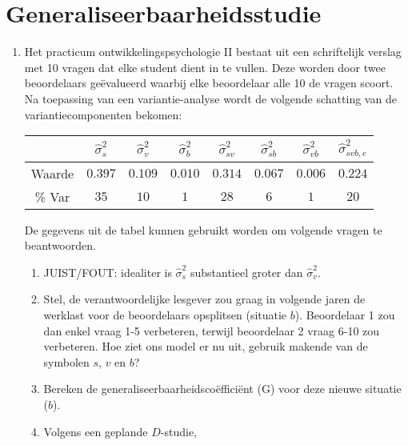 
\OPGAVE
{
\section{Generaliseerbaarheidsstudie}

\begin{enumerate}

\item
Het practicum ontwikkelingspsychologie II bestaat uit een schriftelijk verslag met 10 vragen dat elke student dient in te vullen. Deze worden door twee beoordelaars ge\"{e}valueerd waarbij elke beoordelaar alle 10 de vragen scoort.\\ 
Na toepassing van een variantie-analyse wordt de volgende schatting van de variantiecomponenten bekomen:

\begin{center}
\renewcommand{\arraystretch}{1.2}
\begin{tabular}{|c|c|c|c|c|c|c|c|} \hline
 & $ \hat{\sigma}^2_{s} $ & $ \hat{\sigma}^2_{v} $& $ \hat{\sigma}^2_{b} $ & $ \hat{\sigma}^2_{sv} $ & $ \hat{\sigma}^2_{sb} $ & $ \hat{\sigma}^2_{vb} $ & $ \hat{\sigma}^2_{svb,e} $ \\ \hline
Waarde  & $ 0.397 $ & $ 0.109 $ & $ 0.010 $ & $ 0.314 $ & $ 0.067 $ & $ 0.006 $ & $ 0.224 $ \\ 
\% Var & $ 35 $ & $ 10 $ & $ 1 $ & $ 28 $ & $ 6 $ & $ 1 $ & $ 20 $ \\ \hline
\end{tabular}
\end{center}


\normalsize
De gegevens uit de tabel kunnen gebruikt worden om volgende vragen te beantwoorden.

\begin{enumerate}
\item JUIST/FOUT: idealiter is $ \hat{\sigma}^2_{s} $ substantieel groter dan $ \hat{\sigma}^2_{v}$.
\item Stel, de verantwoordelijke lesgever zou graag in volgende jaren de werklast voor de beoordelaars opsplitsen (situatie $b$). Beoordelaar 1 zou dan enkel vraag 1-5 verbeteren, terwijl beoordelaar 2 vraag 6-10 zou verbeteren. Hoe ziet ons model er nu uit, gebruik makende van de symbolen $s$, $v$ en $b$?
\item Bereken de generaliseerbaarheidsco\"{e}ffici\"{e}nt (G) voor deze nieuwe situatie ($b$).

\item Volgens een geplande $D$-studie, 


\end{enumerate}
\end{enumerate}}

